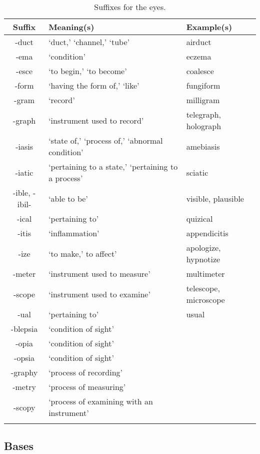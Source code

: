 \begin{longtable}{c | p{} | p{}}
    \caption{Suffixes for the eyes.}
    \hline
    Suffix & Meaning(s) & Example(s) \\ \hline
        -duct & `duct,' `channel,' `tube' & airduct \\
        -ema & `condition' & eczema \\
        -esce & `to begin,' `to become' & coalesce \\
        -form & `having the form of,' `like' & fungiform \\
        -gram & `record' & milligram \\
        -graph & `instrument used to record' & telegraph, holograph \\
        -iasis & `state of,' `process of,' `abnormal condition' & amebiasis \\
        -iatic & `pertaining to a state,' `pertaining to a process' & sciatic \\
        -ible, -ibil- & `able to be' & visible, plausible \\
        -ical & `pertaining to' & quizical \\
        -itis & `inflammation' & appendicitis \\
        -ize & `to make,' to affect' & apologize, hypnotize \\
        -meter & `instrument used to measure' & multimeter \\
        -scope & `instrument used to examine' & telescope, microscope \\
        -ual & `pertaining to' & usual \\
        -blepsia & `condition of sight' & \\
        -opia & `condition of sight' & \\
        -opsia & `condition of sight' & \\
        -graphy & `process of recording' & \\
        -metry & `process of measuring' & \\
        -scopy & `process of examining with an instrument' & \\
    \label{tab:Ch5Suffix}
\end{longtable}


\subsection{Bases}


